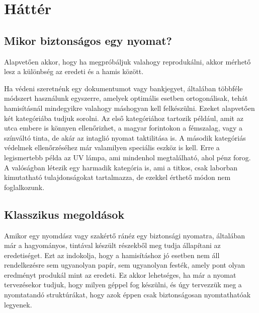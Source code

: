 %

\newpage
\section{Háttér}

%
%




\subsection{Mikor biztonságos egy nyomat?}
\label{sec:nyomatbiztonsag}

Alapvetően akkor, hogy ha megpróbáljuk valahogy reprodukálni, akkor
mérhető lesz a különbség az eredeti és a hamis között.

Ha védeni szeretnénk egy dokumentumot vagy bankjegyet, általában 
többféle módszert használunk egyszerre, amelyek optimális esetben 
ortogonálisak, tehát hamisításnál mindegyikre valahogy máshogyan kell 
felkészülni. Ezeket alapvetően két kategóriába tudjuk sorolni. 
Az első kategóriához tartozik például, amit az utca embere is könnyen ellenőrizhet, 
a magyar forintokon a fémszalag, vagy a színváltó tinta, de akár az intaglió nyomat taktilitása is.
A második kategóriás védelmek ellenőrzéséhez már valamilyen speciális eszköz is kell. Erre a legismertebb 
példa az UV lámpa, ami mindenhol megtalálható, ahol pénz forog.
A valóságban létezik egy harmadik kategória is, ami a titkos, csak 
laborban kimutatható tulajdonságokat tartalmazza, de ezekkel érthető
módon nem foglalkozunk.


\subsection{Klasszikus megoldások}

Amikor egy nyomdász vagy szakértő ránéz egy biztonsági nyomatra, 
általában már a hagyományos, tintával készült részekből meg tudja
állapítani az eredetiséget. Ezt az indokolja, hogy a hamisításhoz jó esetben nem áll 
rendelkezésre sem ugyanolyan papír, sem ugyanolyan festék,
amely pont olyan eredményt produkál mint az eredeti.
Ez akkor lehetséges, ha már a nyomat tervezésekor tudjuk, hogy
milyen géppel fog készülni, és úgy tervezzük meg a nyomtatandó struktúrákat,
hogy azok éppen csak biztonságosan nyomtathatóak legyenek.

